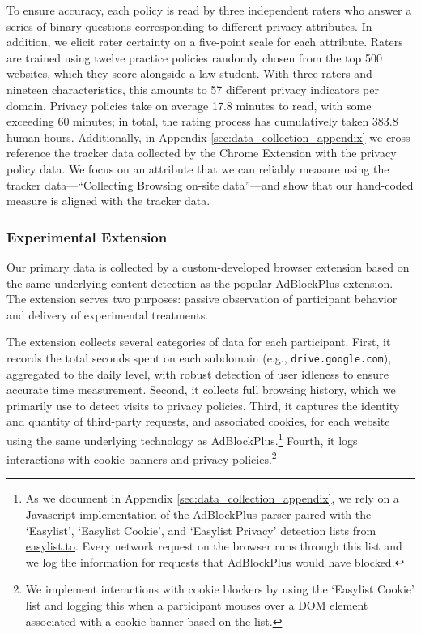 \documentclass[12pt]{article}
\theoremstyle{definition}
\theoremstyle{remark}
\begin{document}
To ensure accuracy, each policy is read by three independent raters who answer a series of binary questions corresponding to different privacy attributes. In addition, we elicit rater certainty on a five-point scale for each attribute. Raters are trained using twelve practice policies randomly chosen from the top 500 websites, which they score alongside a law student. With three raters and nineteen characteristics, this amounts to 57 different privacy indicators per domain. Privacy policies take on average 17.8 minutes to read, with some exceeding 60 minutes; in total, the rating process has cumulatively taken 383.8 human hours. Additionally, in Appendix \ref{sec:data_collection_appendix} we cross-reference the tracker data collected by the Chrome Extension with the privacy policy data. We focus on an attribute that we can reliably measure using the tracker data---``Collecting Browsing on-site data''---and show that our hand-coded measure is aligned with the tracker data.

\subsubsection{Experimental Extension}\label{sec:extension}

Our primary data is collected by a custom-developed browser extension based on the same underlying content detection as the popular AdBlockPlus extension. The extension serves two purposes: passive observation of participant behavior and delivery of experimental treatments.
 
The extension collects several categories of data for each participant. First, it records the total seconds spent on each subdomain (e.g., \texttt{drive.google.com}), aggregated to the daily level, with robust detection of user idleness to ensure accurate time measurement. Second, it collects full browsing history, which we primarily use to detect visits to privacy policies. Third, it captures the identity and quantity of third-party requests, and associated cookies, for each website using the same underlying technology as AdBlockPlus.\footnote{As we document in Appendix \ref{sec:data_collection_appendix}, we rely on a Javascript implementation of the AdBlockPlus parser paired with the `Easylist', `Easylist Cookie', and `Easylist Privacy' detection lists from \url{easylist.to}. Every network request on the browser runs through this list and we log the information for requests that AdBlockPlus would have blocked.} Fourth, it logs interactions with cookie banners and privacy policies.\footnote{We implement interactions with cookie blockers by using the `Easylist Cookie' list and logging this when a participant mouses over a DOM element associated with a cookie banner based on the list.}
 
\end{document}
